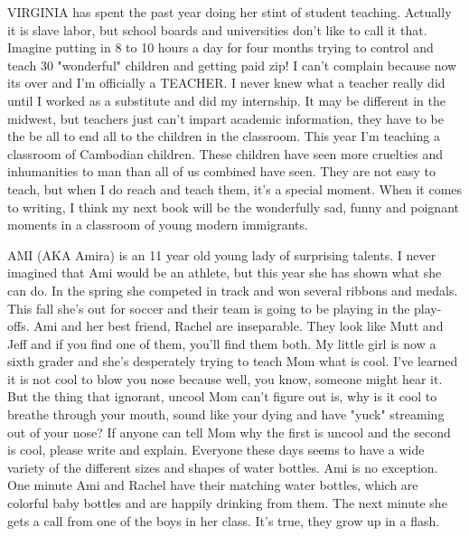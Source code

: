 VIRGINIA has spent the past year doing her stint of student teaching. Actually it is slave labor, but school boards and universities don't like
to call it that. Imagine putting in 8 to 10 hours a day for four months trying to control and teach 30 "wonderful" children and getting paid
zip! I can't complain because now its over and I'm officially a TEACHER. I never knew what a teacher really did until I worked as a substitute
and did my internship. It may be different in the midwest, but teachers just can't impart academic information, they have to be the be all to
end all to the children in the classroom. This year I'm teaching a classroom of Cambodian children. These children have seen more cruelties and
inhumanities to man than all of us combined have seen. They are not easy to teach, but when I do reach and teach them, it's a special moment.
When it comes to writing, I think my next book will be the wonderfully sad, funny and poignant moments in a classroom of young modern
immigrants.

AMI (AKA Amira) is an 11 year old young lady of surprising talents. I never imagined that Ami would be an athlete, but this year she has shown
what she can do. In the spring she competed in track and won several ribbons and medals. This fall she's out for soccer and their team is going
to be playing in the play-offs. Ami and her best friend, Rachel are inseparable. They look like Mutt and Jeff and if you find one of them,
you'll find them both. My little girl is now a sixth grader and she's desperately trying to teach Mom what is cool. I've learned it is not cool
to blow you nose because well, you know, someone might hear it. But the thing that ignorant, uncool Mom can't figure out is, why is it cool to
breathe through your mouth, sound like your dying and have "yuck" streaming out of your nose? If anyone can tell Mom why the first is uncool and
the second is cool, please write and explain. Everyone these days seems to have a wide variety of the different sizes and shapes of water
bottles. Ami is no exception. One minute Ami and Rachel have their matching water bottles, which are colorful baby bottles and are happily
drinking from them. The next minute she gets a call from one of the boys in her class. It's true, they grow up in a flash.

